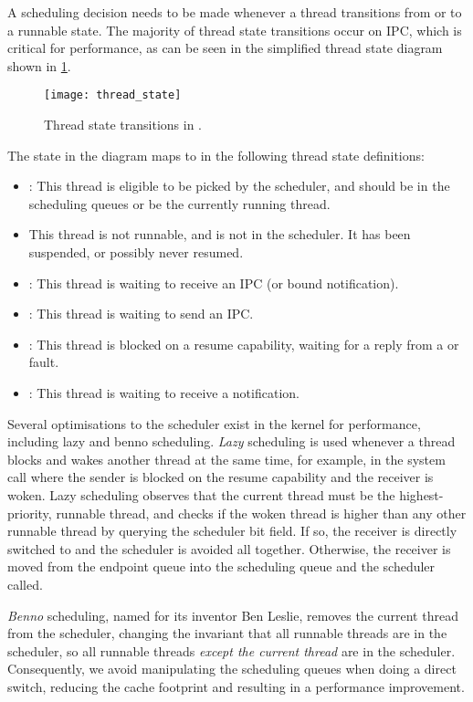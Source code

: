 A scheduling decision needs to be made whenever a thread transitions from or to a runnable state.
The majority of thread state transitions occur on IPC, which is critical for performance, 
as can be seen in the simplified thread state diagram shown in \cref{f:thread_state}. 
\begin{figure}[h!tb]
    \centering
    \texttt{[image: thread\_state]}
    \caption{Thread state transitions in \selfour.}
    \label{f:thread_state}
\end{figure}
The  state in the diagram maps to  in the following thread
state definitions:
\begin{itemize}
    \item {}: This thread is eligible to be picked by the scheduler, and should be in the
        scheduling queues or be the currently running thread.
    \item {} This thread is not runnable, and is not in the scheduler. It has been
        suspended, or possibly never resumed. 
    \item {}: This thread is waiting to receive an IPC (or bound notification). 
    \item {}: This thread is waiting to send an IPC. 
    \item {}: This thread is blocked on a resume capability, waiting for a reply
        from a \call or fault.
    \item {}: This thread is waiting to receive a notification.
\end{itemize}

Several optimisations to the scheduler exist in the kernel for performance, including lazy and benno
scheduling. 
\emph{Lazy} scheduling is used whenever a thread blocks and wakes
another thread at the same time, for example, in the \call system call where the sender is
blocked on the resume capability and the receiver is woken. Lazy scheduling observes that the
current thread must be the highest-priority, runnable thread, and checks if the woken thread is
higher than any other runnable thread by querying the scheduler bit field. If so, the receiver is
directly switched to and the scheduler is avoided all together. Otherwise, the receiver is moved from
the endpoint queue into the scheduling queue and the scheduler called.

\emph{Benno} scheduling, named for its inventor Ben Leslie, removes the current thread from the 
scheduler, changing the invariant that all runnable threads are in the scheduler, so all runnable
threads \emph{except the current thread} are in the scheduler. Consequently, we avoid manipulating the
scheduling queues when doing a direct switch, reducing the cache footprint and resulting in a performance improvement.

